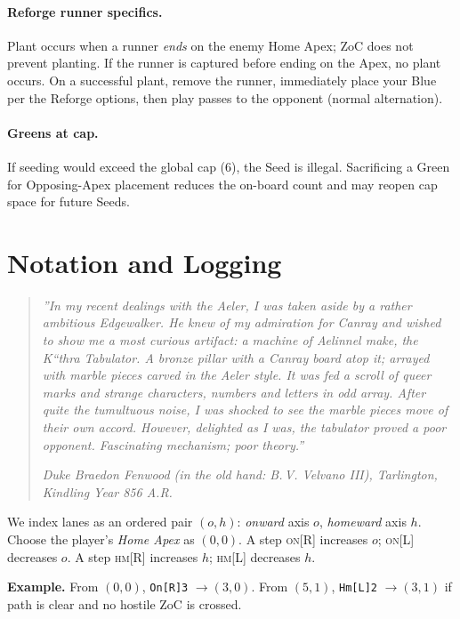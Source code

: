 \documentclass[11pt]{article}
\begin{document}
\paragraph{Reforge runner specifics.}
Plant occurs when a runner \emph{ends} on the enemy Home Apex; ZoC does not prevent planting. If the runner is captured before ending on the Apex, no plant occurs. On a successful plant, remove the runner, immediately place your Blue per the Reforge options, then play passes to the opponent (normal alternation).

\paragraph{Greens at cap.}
If seeding would exceed the global cap (6), the Seed is illegal. Sacrificing a Green for Opposing-Apex placement reduces the on-board count and may reopen cap space for future Seeds.

\bigskip

\clearpage

\section{Notation and Logging}
\label{sec:notation}

\begin{quote}\small\itshape
''In my recent dealings with the Aeler, I was taken aside by a rather ambitious Edgewalker. He knew of my admiration for Canray and wished to show me a most curious artifact: a machine of Aelinnel make, the K``thra Tabulator. A bronze pillar with a Canray board atop it; arrayed with marble pieces carved in the Aeler style. It was fed a scroll of queer marks and strange characters, numbers and letters in odd array. After quite the tumultuous noise, I was shocked to see the marble pieces move of their own accord. However, delighted as I was, the tabulator proved a poor opponent. Fascinating mechanism; poor theory.''

\hfill\emph{Duke Braedon Fenwood (in the old hand: B.\,V. Velvano III), Tarlington, Kindling Year 856 A.R.}
\end{quote}

\begin{tcolorbox}[enhanced,breakable,title={(o,h) Coordinates --- Minimal Reference},
  colback=white,colframe=royal,boxrule=0.8pt]
\small
We index lanes as an ordered pair $(o,h)$: \emph{onward} axis $o$, \emph{homeward} axis $h$.
Choose the player's \emph{Home Apex} as $(0,0)$. A step \textsc{on}[R] increases $o$; \textsc{on}[L] decreases $o$. A step \textsc{hm}[R] increases $h$; \textsc{hm}[L] decreases $h$.

\textbf{Example.} From $(0,0)$, \texttt{On[R]3} $\to (3,0)$. From $(5,1)$, \texttt{Hm[L]2} $\to (3,1)$ if path is clear and no hostile ZoC is crossed.
\end{tcolorbox}
\end{document}
